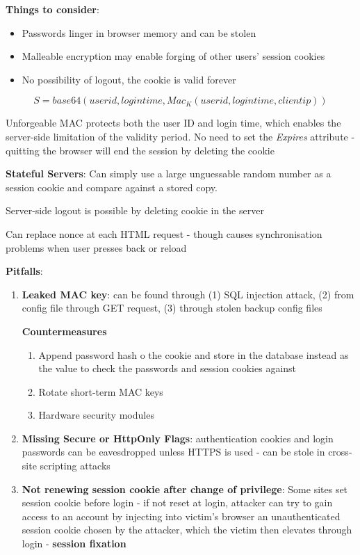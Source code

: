 \documentclass{article}
\newenvironment{pros}{\par\color[rgb]{0.066, 0.4, 0.129}}{\par}
\newenvironment{cons}{\par\color{red}}{\par}
\begin{document}
\bigskip
\noindent
\textbf{Things to consider}:
\begin{itemize}
	\item Passwords linger in browser memory and can be stolen
	\item Malleable encryption may enable forging of other users' session cookies
	\item No possibility of logout, the cookie is valid forever
\end{itemize}

$$S = base64(userid, logintime, Mac_{K}(userid, logintime, clientip))$$

Unforgeable MAC protects both the user ID and login time, which enables the server-side limitation of the validity period. No need to set the \textit{Expires} attribute - quitting the browser will end the session by deleting the cookie

\bigskip
\noindent
\textbf{Stateful Servers}: Can simply use a large unguessable random number as a session cookie and compare against a stored copy.

\begin{pros}
	Server-side logout is possible by deleting cookie in the server
	
	Can replace nonce at each HTML request - though causes synchronisation problems when user presses back or reload
\end{pros}

\begin{cons}
\bigskip
\noindent
\textbf{Pitfalls}:
\begin{enumerate}
	\item \textbf{Leaked MAC key}: can be found through (1) SQL injection attack, (2) from config file through GET request, (3) through stolen backup config files
	
	\begin{pros}
	\textbf{Countermeasures}
	\begin{enumerate}
		\item Append password hash o the cookie and store in the database instead as the value to check the passwords and session cookies against
		\item Rotate short-term MAC keys
		\item Hardware security modules
	\end{enumerate}
	\end{pros}
	
	\item \textbf{Missing Secure or HttpOnly Flags}: authentication cookies and login passwords can be eavesdropped unless HTTPS is used - can be stole in cross-site scripting attacks
	
	\item \textbf{Not renewing session cookie after change of privilege}: Some sites set session cookie before login - if not reset at login, attacker can try to gain access to an account by injecting into victim's browser an unauthenticated session cookie chosen by the attacker, which the victim then elevates through login - \textbf{session fixation}
\end{enumerate}
\end{cons}
\end{document}

